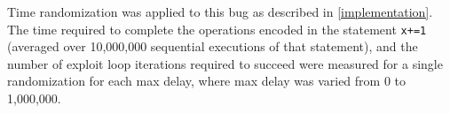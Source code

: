 Time randomization was applied to this bug as described in \autoref{implementation}.
The time required to complete the operations encoded in the statement \texttt{x+=1} (averaged over 10,000,000 sequential executions of that statement), and the number of exploit loop iterations required to succeed were measured for a single randomization for each max delay, where max delay was varied from 0 to 1,000,000.
